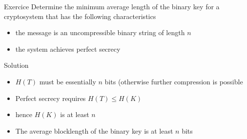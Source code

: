 \begin{parag}{Exercice}
    Determine the minimum average length of the binary key for a cryptosystem that has the following characteristics
\begin{itemize}
    \item the message is an uncompressible binary string of length $n$
    \item the system achieves perfect secrecy
\end{itemize}
\begin{subparag}{Solution}
    \begin{itemize}
        \item $H(T)$ must be essentially $n$ bits (otherwise further compression is possible
        \item Perfect secrecy requires $H(T) \leq H(K)$
        \item  hence $H(K)$ is at least $n$
        \item The average blocklength of the binary key is at least $n$ bits
    \end{itemize}
\end{subparag}
\end{parag}

